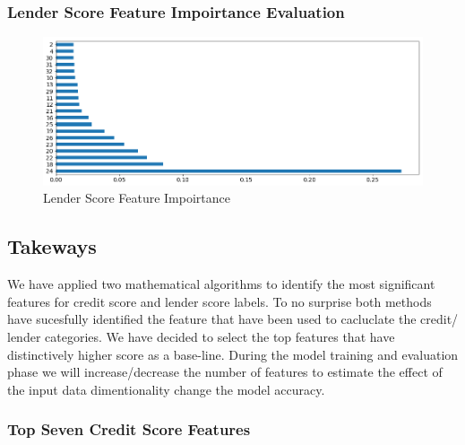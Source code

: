 \hypertarget{lender-score-feature-impoirtance-evaluation}{%
\subsubsection{Lender Score Feature Impoirtance
Evaluation}\label{lender-score-feature-impoirtance-evaluation}}

\begin{Schunk}
\begin{figure}[H]

{\centering \includegraphics[width=1\linewidth]{../../artifacts/lfimportance} 

}

\caption[Lender Score Feature Impoirtance]{Lender Score Feature Impoirtance}\label{fig:lfi}
\end{figure}
\end{Schunk}

\hypertarget{takeways}{%
\subsection{Takeways}\label{takeways}}

We have applied two mathematical algorithms to identify the most
significant features for credit score and lender score labels. To no
surprise both methods have sucesfully identified the feature that have
been used to cacluclate the credit/ lender categories. We have decided
to select the top features that have distinctively higher score as a
base-line. During the model training and evaluation phase we will
increase/decrease the number of features to estimate the effect of the
input data dimentionality change the model accuracy.

\hypertarget{top-seven-credit-score-features}{%
\subsubsection{Top Seven Credit Score
Features}\label{top-seven-credit-score-features}}

